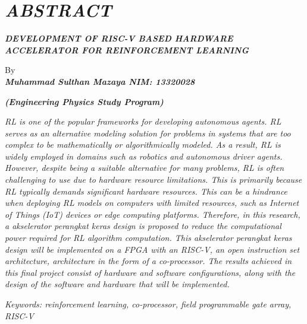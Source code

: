 \clearpage
\chapter*{\textit{ABSTRACT}}

\begin{center}
	\begin{singlespace}
		\center
		\large\bfseries\MakeUppercase{\textit{DEVELOPMENT OF RISC-V BASED HARDWARE ACCELERATOR FOR REINFORCEMENT LEARNING}}
		
		\normalfont\normalsize
		
		By\\
		\bfseries{\textit{Muhammad Sulthan Mazaya \hspace{5mm} NIM: 13320028}}
		
		\vspace{5mm}
		\large\bfseries{\textit{(Engineering Physics Study Program)}}
		\vspace{5mm}
	\end{singlespace}
\end{center}


\begin{singlespace}
	\small
	\textit{\acf{RL} is one of the popular frameworks for developing
		autonomous agents. \ac{RL} serves as an alternative modeling solution for problems in
		systems that are too complex to be mathematically or algorithmically modeled. As
		a result, \ac{RL} is widely employed in domains such as robotics and autonomous driver
		agents. However, despite being a suitable alternative for many problems, \ac{RL} is
		often challenging to use due to hardware resource limitations. This is primarily
		because \ac{RL} typically demands significant hardware resources. This can be a
		hindrance when deploying \ac{RL} models on computers with limited resources, such as
		Internet of Things (IoT) devices or edge computing platforms. Therefore, in this
		research, a akselerator perangkat keras design is proposed to reduce the
		computational power required for \ac{RL} algorithm computation. This akselerator
		perangkat keras design will be implemented on a \acl{FPGA}
		with an RISC-V, an open instruction set architecture, architecture in the form of a
		co-processor. The results achieved in this final project consist of hardware and
		software configurations, along with the design of the software and hardware that
		will be implemented.
	}
	
	\textit{Keywords: reinforcement learning, co-processor, field programmable gate array, RISC-V}
\end{singlespace}
\clearpage

\clearpage
